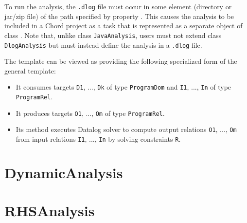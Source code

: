 To run the analysis, the {\tt .dlog} file must occur in some element (directory
or jar/zip file) of the path specified by property .
 This causes the analysis to be included in a Chord project as a task that is
represented as a separate object of class
.
Note that, unlike class {\tt JavaAnalysis}, users must not extend class
{\tt DlogAnalysis} but must instead define the analysis in a {\tt .dlog} file.

The  template can be viewed as providing the following
specialized form of the general  template:
\begin{itemize}
\item
It consumes targets {\tt D1}, ..., {\tt Dk} of type {\tt ProgramDom} and
{\tt I1}, ..., {\tt In} of type {\tt ProgramRel}.
\item
It produces targets {\tt O1}, ..., {\tt Om} of type {\tt ProgramRel}.
\item
Its  method executes Datalog solver  to compute output
relations {\tt O1}, ..., {\tt Om} from input relations {\tt I1}, ..., {\tt In}
by solving constraints {\tt R}.
\end{itemize}

\section{DynamicAnalysis}
\label{sec:dynamic}

\section{RHSAnalysis}
\label{sec:rhs}

